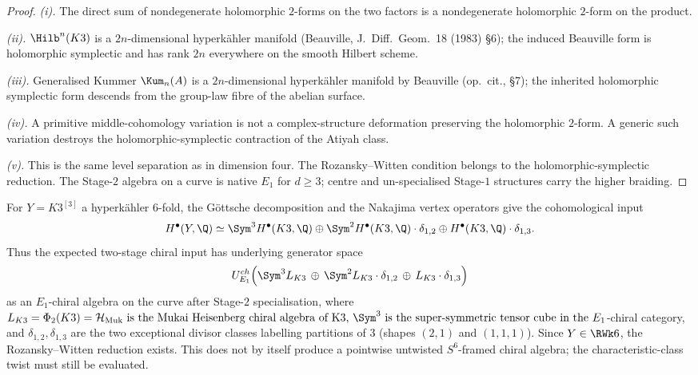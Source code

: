 \begin{proof}
\emph{(i).} The direct sum of nondegenerate holomorphic \(2\)-forms on the
two factors is a nondegenerate holomorphic \(2\)-form on the product.

\emph{(ii).} \(\Hilb^n(K3)\) is a \(2n\)-dimensional hyperk\"ahler manifold
\textup{(}Beauville, J.\ Diff.\ Geom.~18 \textup{(}1983\textup{)} \S 6\textup{);}
the induced Beauville form is holomorphic symplectic and has rank \(2n\)
everywhere on the smooth Hilbert scheme.

\emph{(iii).} Generalised Kummer \(\Kum_n(A)\) is a \(2n\)-dimensional
hyperk\"ahler manifold by Beauville \textup{(}op.\ cit., \S 7\textup{);} the
inherited holomorphic symplectic form descends from the group-law fibre of
the abelian surface.

\emph{(iv).} A primitive middle-cohomology variation is not a
complex-structure deformation preserving the holomorphic \(2\)-form. A
generic such variation destroys the holomorphic-symplectic contraction of
the Atiyah class.

\emph{(v).} This is the same level separation as in dimension four. The
Rozansky--Witten condition belongs to the holomorphic-symplectic reduction.
The Stage-$2$ algebra on a curve is native \(E_1\) for \(d\ge3\); centre
and un-specialised Stage-$1$ structures carry the higher braiding.
\end{proof}

\begin{remark}
\label{rem:phi-6-hilb3-k3-explicit}
%
For \(Y=K3^{[3]}\) a hyperk\"ahler \(6\)-fold, the G\"ottsche decomposition
and the Nakajima vertex operators give the cohomological input
\[
 H^\bullet(Y,\Q)\simeq \Sym^3H^\bullet(K3,\Q)\oplus
 \Sym^2H^\bullet(K3,\Q)\cdot\delta_{1,2}\oplus
 H^\bullet(K3,\Q)\cdot\delta_{1,3}.
\]
Thus the expected two-stage chiral input has underlying generator space
\[
 U^{ch}_{E_1}\Bigl(\Sym^3 L_{K3} \,\oplus\,
 \Sym^2 L_{K3} \cdot \delta_{1,2} \,\oplus\, L_{K3} \cdot \delta_{1,3}\Bigr)
\]
as an \(E_1\)-chiral algebra on the curve after Stage-$2$ specialisation,
where \(L_{K3} =
\Phi_2(K3) = \mathcal{H}_{\mathrm{Muk}}$ is the Mukai Heisenberg chiral
algebra of K$3$, $\Sym^3$ is the super-symmetric tensor cube in the
\(E_1\)-chiral category, and \(\delta_{1,2}, \delta_{1,3}\) are the two
exceptional divisor classes labelling partitions of $3$
\textup{(}shapes $(2,1)$ and $(1,1,1)$\textup{).} Since \(Y\in\RWk6\),
the Rozansky--Witten reduction exists. This does not by itself produce a
pointwise untwisted \(S^6\)-framed chiral algebra; the characteristic-class
twist must still be evaluated.
\end{remark}

